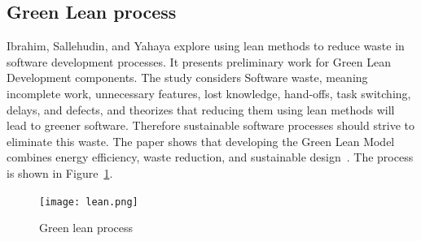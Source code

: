 \subsection{Green Lean process}\label{waste}
Ibrahim, Sallehudin, and Yahaya explore using lean methods to reduce waste in software development processes. It presents preliminary work for Green Lean Development components. The study considers Software waste, meaning incomplete work, unnecessary features, lost knowledge, hand-offs, task switching, delays, and defects, and theorizes that reducing them using lean methods will lead to greener software. Therefore sustainable software processes should strive to eliminate this waste. The paper shows that developing the Green Lean Model combines energy efficiency, waste reduction, and sustainable design~\cite{waste}. The process is shown in Figure~\ref{lean}.

\begin{figure}[H]
\caption{Green lean process~\cite{waste}}
\label{lean}
\texttt{[image: lean.png]}
\centering
\end{figure}
